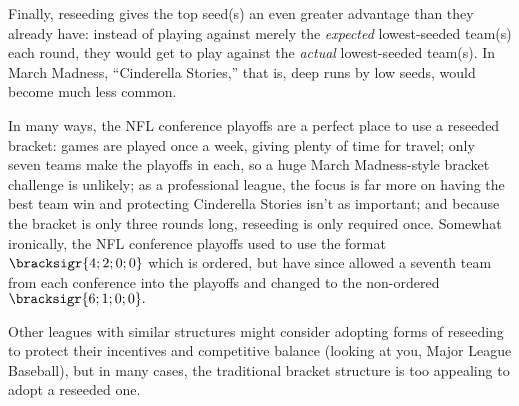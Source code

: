 {Finally, reseeding gives the top seed(s) an even greater advantage than they already have: instead of playing against merely the \textit{expected} lowest-seeded team(s) each round, they would get to play against the \textit{actual} lowest-seeded team(s). In March Madness, ``Cinderella Stories,'' that is, deep runs by low seeds, would become much less common.

In many ways, the NFL conference playoffs are a perfect place to use a reseeded bracket: games are played once a week, giving plenty of time for travel; only seven teams make the playoffs in each, so a huge March Madness-style bracket challenge is unlikely; as a professional league, the focus is far more on having the best team win and protecting Cinderella Stories isn't as important; and because the bracket is only three rounds long, reseeding is only required once. Somewhat ironically, the NFL conference playoffs used to use the format $\bracksigr{4;2;0;0}$ which is ordered, but have since allowed a seventh team from each conference into the playoffs and changed to the non-ordered $\bracksigr{6;1;0;0}.$ 

Other leagues with similar structures might consider adopting forms of reseeding to protect their incentives and competitive balance (looking at you, Major League Baseball), but in many cases, the traditional bracket structure is too appealing to adopt a reseeded one.
}